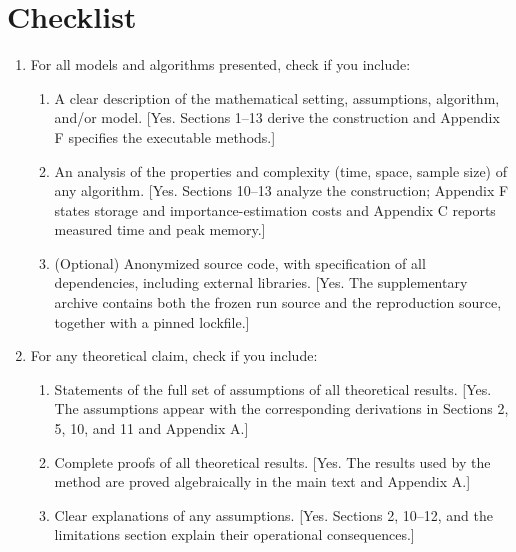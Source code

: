 \section*{Checklist}

\begin{enumerate}
  \item For all models and algorithms presented, check if you include:
  \begin{enumerate}
    \item A clear description of the mathematical setting, assumptions,
    algorithm, and/or model. [Yes. Sections 1--13 derive the construction and
    Appendix F specifies the executable methods.]
    \item An analysis of the properties and complexity (time, space, sample
    size) of any algorithm. [Yes. Sections 10--13 analyze the construction;
    Appendix F states storage and importance-estimation costs and Appendix C
    reports measured time and peak memory.]
    \item (Optional) Anonymized source code, with specification of all
    dependencies, including external libraries. [Yes. The supplementary
    archive contains both the frozen run source and the reproduction source,
    together with a pinned lockfile.]
  \end{enumerate}

  \item For any theoretical claim, check if you include:
  \begin{enumerate}
    \item Statements of the full set of assumptions of all theoretical results.
    [Yes. The assumptions appear with the corresponding derivations in
    Sections 2, 5, 10, and 11 and Appendix A.]
    \item Complete proofs of all theoretical results. [Yes. The results used by
    the method are proved algebraically in the main text and Appendix A.]
    \item Clear explanations of any assumptions. [Yes. Sections 2, 10--12, and
    the limitations section explain their operational consequences.]
  \end{enumerate}


\end{enumerate}
